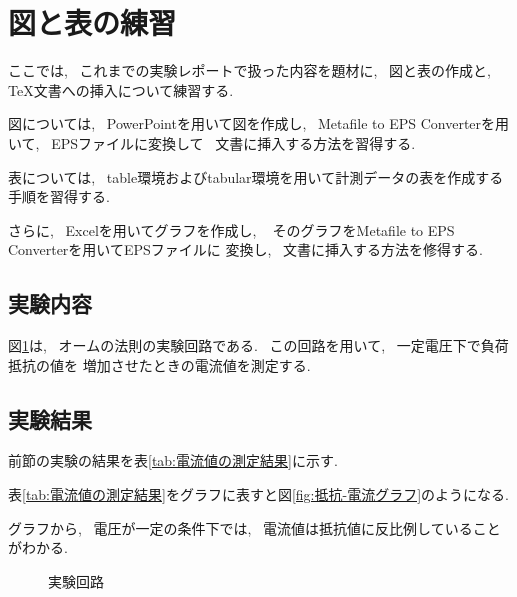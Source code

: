 \documentclass[titlepage]{jarticle}
\begin{document}
\section{図と表の練習}
	ここでは, ~これまでの実験レポートで扱った内容を題材に, ~図と表の作成と, {\TeX}文書への挿入について練習する.

	図については, ~PowerPointを用いて図を作成し, ~Metafile to EPS Converterを用いて, ~EPSファイルに変換して
	~文書に挿入する方法を習得する.

	表については, ~table環境およびtabular環境を用いて計測データの表を作成する手順を習得する.

	さらに, ~Excelを用いてグラフを作成し, ~ そのグラフをMetafile to EPS Converterを用いてEPSファイルに
	変換し, ~文書に挿入する方法を修得する.

	\subsection{実験内容}
		図\ref{fig:実験回路}は, ~オームの法則の実験回路である. ~この回路を用いて, ~一定電圧下で負荷抵抗の値を
		増加させたときの電流値を測定する.

	\subsection{実験結果}
		前節の実験の結果を表\ref{tab:電流値の測定結果}に示す.

		表\ref{tab:電流値の測定結果}をグラフに表すと図\ref{fig:抵抗-電流グラフ}のようになる.

		グラフから, ~電圧が一定の条件下では, ~電流値は抵抗値に反比例していることがわかる.

	\begin{figure}[h]
		\caption{実験回路} \label{fig:実験回路}
	\end{figure}
\end{document}
